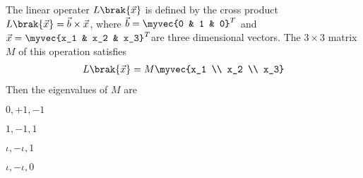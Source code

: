    \item 
    The linear operater $L\brak{\vec{x}}$ is defined by the cross product $L\brak{\vec{x}} = \vec{b} \times \vec{x}$, where $\vec{b} = \myvec{0 & 1 & 0}^{T}$ and $\vec{x} = \myvec{x_1 & x_2 & x_3}^{T}$are three dimensional vectors. The $3 \times 3$ matrix $M$ of this operation satisfies 
    \begin{align*}
        L\brak{\vec{x}} = M\myvec{x_1 \\ x_2 \\ x_3}
    \end{align*}
    Then the eigenvalues of $M$ are
    \hfill{}
    \begin{enumerate}
    \begin{multicols}{4}
        \item $0, +1, -1$
        \item $1, -1, 1$
        \item $\iota, -\iota, 1$
        \item $\iota, -\iota, 0$
    \end{multicols}
    \end{enumerate}


